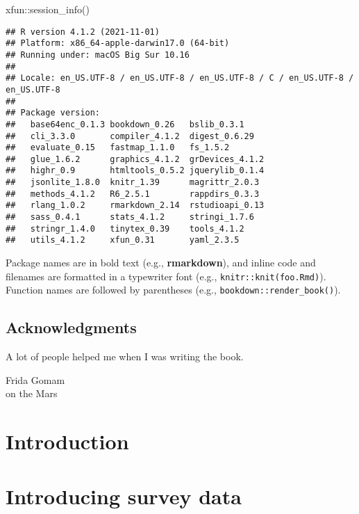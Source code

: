 \documentclass[
]{krantz}
\makeatletter
\newenvironment{Shaded}{\begin{snugshade}}{\end{snugshade}}
\newcommand{\FunctionTok}[1]{\textcolor[rgb]{0,0,0}{#1}}
\newcommand{\NormalTok}[1]{#1}
\newcommand{\SpecialCharTok}[1]{\textcolor[rgb]{0,0,0}{#1}}
\newenvironment{kframe}{%
\medskip{}
\setlength{\fboxsep}{.8em}
 \def\at@end@of@kframe{}%
 \ifinner\ifhmode%
  \def\at@end@of@kframe{\end{minipage}}%
  \begin{minipage}{\columnwidth}%
 \fi\fi%
 \def\FrameCommand##1{\hskip\@totalleftmargin \hskip-\fboxsep
 \colorbox{shadecolor}{##1}\hskip-\fboxsep
     \hskip-\linewidth \hskip-\@totalleftmargin \hskip\columnwidth}%
 \MakeFramed {\advance\hsize-\width
   \@totalleftmargin\z@ \linewidth\hsize
   \@setminipage}}%
 {\par\unskip\endMakeFramed%
 \at@end@of@kframe}
\renewenvironment{Shaded}{\begin{kframe}}{\end{kframe}}
\makeatother
\begin{document}
\begin{Shaded}
\begin{Highlighting}[]
\NormalTok{xfun}\SpecialCharTok{::}\FunctionTok{session\_info}\NormalTok{()}
\end{Highlighting}
\end{Shaded}

\begin{verbatim}
## R version 4.1.2 (2021-11-01)
## Platform: x86_64-apple-darwin17.0 (64-bit)
## Running under: macOS Big Sur 10.16
## 
## Locale: en_US.UTF-8 / en_US.UTF-8 / en_US.UTF-8 / C / en_US.UTF-8 / en_US.UTF-8
## 
## Package version:
##   base64enc_0.1.3 bookdown_0.26   bslib_0.3.1    
##   cli_3.3.0       compiler_4.1.2  digest_0.6.29  
##   evaluate_0.15   fastmap_1.1.0   fs_1.5.2       
##   glue_1.6.2      graphics_4.1.2  grDevices_4.1.2
##   highr_0.9       htmltools_0.5.2 jquerylib_0.1.4
##   jsonlite_1.8.0  knitr_1.39      magrittr_2.0.3 
##   methods_4.1.2   R6_2.5.1        rappdirs_0.3.3 
##   rlang_1.0.2     rmarkdown_2.14  rstudioapi_0.13
##   sass_0.4.1      stats_4.1.2     stringi_1.7.6  
##   stringr_1.4.0   tinytex_0.39    tools_4.1.2    
##   utils_4.1.2     xfun_0.31       yaml_2.3.5
\end{verbatim}

Package names are in bold text (e.g., \textbf{rmarkdown}), and inline code and filenames are formatted in a typewriter font (e.g., \texttt{knitr::knit(\textquotesingle{}foo.Rmd\textquotesingle{})}). Function names are followed by parentheses (e.g., \texttt{bookdown::render\_book()}).

\hypertarget{acknowledgments}{%
\section*{Acknowledgments}\label{acknowledgments}}


A lot of people helped me when I was writing the book.

\begin{flushright}
Frida Gomam\\
on the Mars
\end{flushright}

\mainmatter

\hypertarget{c01}{%
\chapter{Introduction}\label{c01}}

\hypertarget{c02}{%
\chapter{Introducing survey data}\label{c02}}
\end{document}
